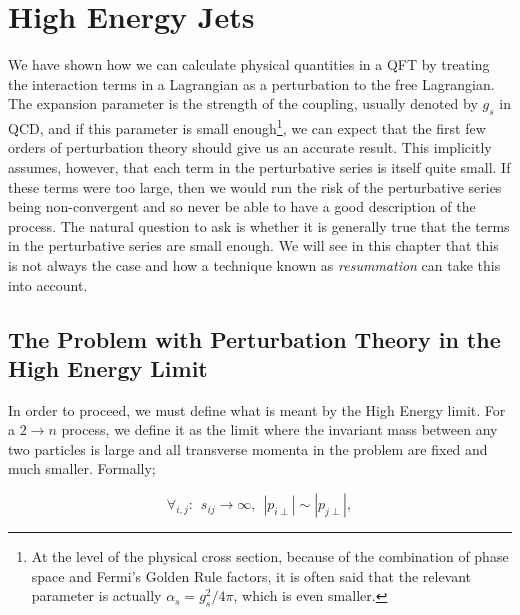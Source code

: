 \chapter{High Energy Jets}


We have shown how we can calculate physical quantities in a QFT by treating the interaction terms in a Lagrangian as a perturbation to the free Lagrangian. The expansion parameter is the strength of the coupling, usually denoted by $g_s$ in QCD, and if this parameter is small enough\footnote{At the level of the physical cross section, because of the combination of phase space and Fermi's Golden Rule factors, it is often said that the relevant parameter is actually $\alpha_s = g_s^2/4 \pi$, which is even smaller.}, we can expect that the first few orders of perturbation theory should give us an accurate result. This implicitly assumes, however, that each term in the perturbative series is itself quite small. If these terms were too large, then we would run the risk of the perturbative series being non-convergent and so never be able to have a good description of the process. The natural question to ask is whether it is generally true that the terms in the perturbative series are small enough. We will see in this chapter that this is not always the case and how a technique known as \emph{resummation} can take this into account. 

\section{The Problem with Perturbation Theory in the High Energy Limit}
In order to proceed, we must define what is meant by the High Energy limit. For a $2 \to n$ process, we define it as the limit where the invariant mass between any two particles is large and all transverse momenta in the problem are fixed and much smaller. Formally;

\begin{equation}
\forall_{i,j}:  \hspace{5pt} s_{ij} \to \infty, \hspace{5pt} |p_{i \perp}| \sim |p_{j \perp}|,
\end{equation}

